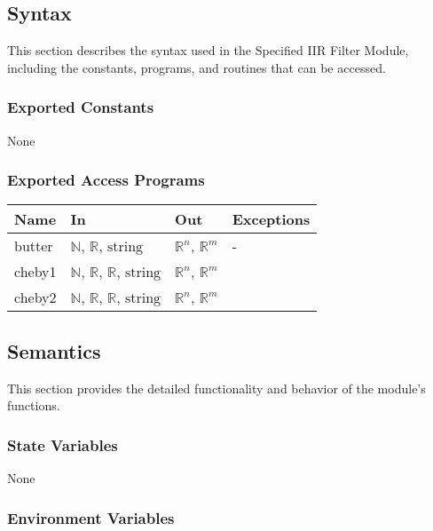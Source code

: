 \documentclass[12pt, titlepage]{article}
\begin{document}
\subsection{Syntax}

This section describes the syntax used in the Specified IIR Filter Module,
including the constants, programs, and routines that can be accessed.

\subsubsection{Exported Constants}

None

\subsubsection{Exported Access Programs}

\begin{center}
\begin{tabular}{p{2cm} p{4cm} p{4cm} p{2cm}}
\hline
\textbf{Name} & \textbf{In} & \textbf{Out} & \textbf{Exceptions} \\
\hline
butter & $\mathbb{N}$, $\mathbb{R}$, $\text{string}$ & $\mathbb{R}^{n}$,
$\mathbb{R}^{m}$ & - \\
cheby1 & $\mathbb{N}$, $\mathbb{R}$, $\mathbb{R}$, $\text{string}$ &
$\mathbb{R}^{n}$, $\mathbb{R}^{m}$ \\
cheby2 & $\mathbb{N}$, $\mathbb{R}$, $\mathbb{R}$, $\text{string}$ &
$\mathbb{R}^{n}$, $\mathbb{R}^{m}$ \\
\hline
\end{tabular}
\end{center}

\subsection{Semantics}

This section provides the detailed functionality and behavior of the module’s
functions.

\subsubsection{State Variables}

None

\subsubsection{Environment Variables}
\end{document}
